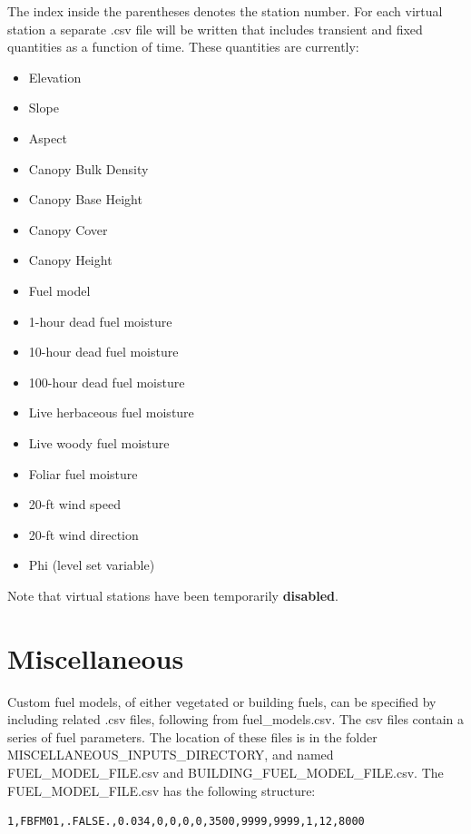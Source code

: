 The index inside the parentheses denotes the station number. For each virtual station a separate .csv file will be written that includes transient and fixed quantities as a function of time. These quantities are currently:

\begin{itemize}
    \item Elevation
    \item Slope
    \item Aspect
    \item Canopy Bulk Density
    \item Canopy Base Height
    \item Canopy Cover
    \item Canopy Height
    \item Fuel model
    \item 1-hour dead fuel moisture
    \item 10-hour dead fuel moisture
    \item 100-hour dead fuel moisture
    \item Live herbaceous fuel moisture
    \item Live woody fuel moisture
    \item Foliar fuel moisture
    \item 20-ft wind speed
    \item 20-ft wind direction
    \item Phi (level set variable)
\end{itemize}

Note that virtual stations have been temporarily \textbf{disabled}.

\section{Miscellaneous}
\label{misc}

Custom fuel models, of either vegetated or building fuels, can be specified by including related .csv files, following from fuel\_models.csv. The csv files contain a series of fuel parameters. The location of these files is in the folder MISCELLANEOUS\_INPUTS\_DIRECTORY, and named FUEL\_MODEL\_FILE.csv and BUILDING\_FUEL\_MODEL\_FILE.csv. The FUEL\_MODEL\_FILE.csv has the following structure:

\begin{verbatim}
1,FBFM01,.FALSE.,0.034,0,0,0,0,3500,9999,9999,1,12,8000
\end{verbatim}

